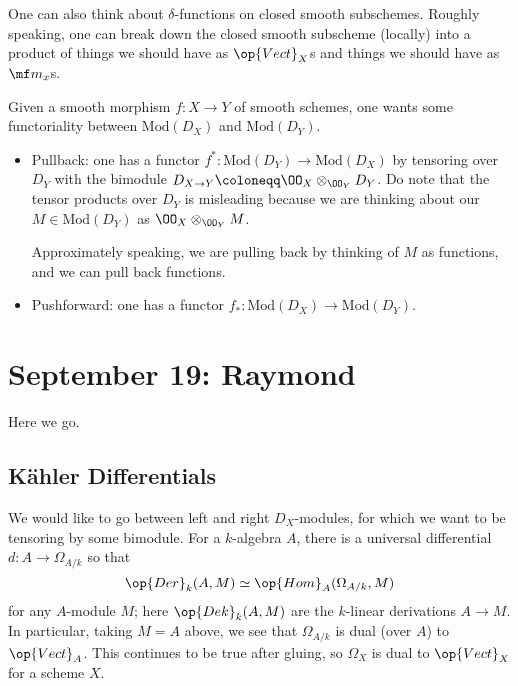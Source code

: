 \documentclass{article}
\begin{document}
\begin{example}
	One can also think about $\delta$-functions on closed smooth subschemes. Roughly speaking, one can break down the closed smooth subscheme (locally) into a product of things we should have as $\op{Vect}_X$s and things we should have as $\mf m_x$s.
\end{example}
Given a smooth morphism $f\colon X\to Y$ of smooth schemes, one wants some functoriality between $\mathrm{Mod}(D_X)$ and $\mathrm{Mod}(D_Y)$.
\begin{itemize}
	\item Pullback: one has a functor $f^*\colon\mathrm{Mod}(D_Y)\to\mathrm{Mod}(D_X)$ by tensoring over $D_Y$ with the bimodule $D_{X\to Y}\coloneqq\OO_X\otimes_{\OO_Y}D_Y$. Do note that the tensor products over $D_Y$ is misleading because we are thinking about our $M\in\mathrm{Mod}(D_Y)$ as $\OO_X\otimes_{\OO_Y}M$.
	
	Approximately speaking, we are pulling back by thinking of $M$ as functions, and we can pull back functions.

	\item Pushforward: one has a functor $f_*\colon\mathrm{Mod}(D_X)\to\mathrm{Mod}(D_Y)$.
\end{itemize}

\section{September 19: Raymond}
Here we go.

\subsection{K\"ahler Differentials}
We would like to go between left and right $D_X$-modules, for which we want to be tensoring by some bimodule. For a $k$-algebra $A$, there is a universal differential $d\colon A\to\Omega_{A/k}$ so that
\[\op{Der}_k(A,M)\simeq\op{Hom}_A(\Omega_{A/k},M)\]
for any $A$-module $M$; here $\op{Dek}_k(A,M)$ are the $k$-linear derivations $A\to M$. In particular, taking $M=A$ above, we see that $\Omega_{A/k}$ is dual (over $A$) to $\op{Vect}_A$. This continues to be true after gluing, so $\Omega_{X}$ is dual to $\op{Vect}_X$ for a scheme $X$.
\end{document}
